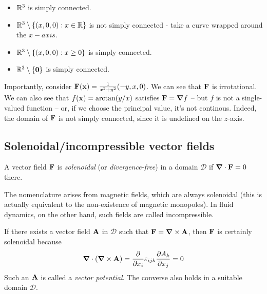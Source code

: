 \documentclass{../../template/note}
\begin{document}
    \begin{example*}
        \begin{itemize}
            \item \(\mathbb R^3\) is simply connected.
            \item \(\mathbb R^3 \setminus \{(x, 0, 0): x \in \mathbb R\}\) is not simply connected - take a curve wrapped around the \(x-axis\).
            \item \(\mathbb R^3 \setminus \{(x, 0, 0): x \geq 0\}\) is simply connected.
            \item \(\RR^3 \setminus \{\V 0\}\) is simply connected.
        \end{itemize}
        Importantly, consider \(\V F(\V x) = \frac{1}{x^2+y^2}(-y, x, 0)\). We can see that \(\V F\) is irrotational. We can also see that \(f(\V x) = \arctan(y/x)\) satisfies \(\V F = \grad f\) -- but \(f\) is not a single-valued function -- or, if we choose the principal value, it's not continous. Indeed, the domain of \(\V F\) is not simply connected, since it is undefined on the \(z\)-axis.
    \end{example*}

    
    \subsection{Solenoidal/incompressible vector fields}

    \begin{definition*}
        A vector field \(\V F\) is \emph{solenoidal} (or \emph{divergence-free}) in a domain \(\mathscr D\) if \(\div \V F = 0\) there.
    \end{definition*}
    
    \begin{remark*}
        The nomenclature arises from magnetic fields, which are always solenoidal (this is actually equivalent to the non-existence of magnetic monopoles). In fluid dynamics, on the other hand, such fields are called incompressible.
    \end{remark*}
    
    If there exists a vector field \(\V A\) in \(\mathscr D\) such that \(\V F = \curl \V A\), then \(\V F\) is certainly solenoidal because
    \begin{align*}
        \div(\curl \V A) = \pd{}{x_i} \lv{ijk} \pd{A_k}{x_j} = 0
    \end{align*}
    Such an \(\V A\) is called a \emph{vector potential}. The converse also holds in a suitable domain \(\mathscr D\). 
    
\end{document}

